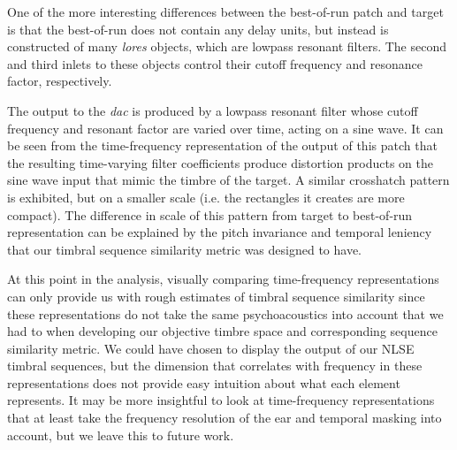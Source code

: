 \documentclass[12pt]{report} 	%
\numberwithin{figure}{chapter}
\numberwithin{table}{chapter}
\numberwithin{equation}{chapter}
\begin{document}
\begin{flushleft}
One of the more interesting differences between the best-of-run patch and target is that the best-of-run does not contain any delay units, but instead is constructed of many \textit{lores\texttildelow{}} objects, which are lowpass resonant filters. The second and third inlets to these objects control their cutoff frequency and resonance factor, respectively.

The output to the \textit{dac\texttildelow{}} is produced by a lowpass resonant filter whose cutoff frequency and resonant factor are varied over time, acting on a sine wave. It can be seen from the time-frequency representation of the output of this patch that the resulting time-varying filter coefficients produce distortion products on the sine wave input that mimic the timbre of the target. A similar crosshatch pattern is exhibited, but on a smaller scale (i.e. the rectangles it creates are more compact). The difference in scale of this pattern from target to best-of-run representation can be explained by the pitch invariance and temporal leniency that our timbral sequence similarity metric was designed to have.

At this point in the analysis, visually comparing time-frequency representations can only provide us with rough estimates of timbral sequence similarity since these representations do not take the same psychoacoustics into account that we had to when developing our objective timbre space and corresponding sequence similarity metric. We could have chosen to display the output of our NLSE timbral sequences, but the dimension that correlates with frequency in these representations does not provide easy intuition about what each element represents. It may  be more insightful to look at time-frequency representations that at least take the frequency resolution of the ear and temporal masking into account, but we leave this to future work.


\end{flushleft}
\end{document}

